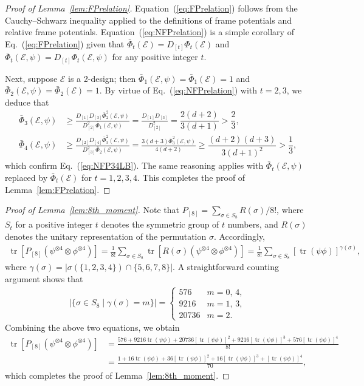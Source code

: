 \documentclass[aps,pra,twocolumn,nofootinbib,superscriptaddress,10pt]{revtex4-2}
\DeclareMathOperator{\tr}{tr}
\newcommand{\caE}{\mathcal{E}}
\newcommand{\bPhi}{\bar{\Phi}}
\newcommand{\eref}[1]{Eq.~\textup{(\ref{#1})}}
\newcommand{\Eref}[1]{Equation~\textup{(\ref{#1})}}
\newcommand{\lref}[1]{Lemma~\ref{#1}}
\begin{document}
\begin{proof}[Proof of \lref{lem:FPrelation}]
\Eref{eq:FPrelation} follows from the Cauchy--Schwarz inequality applied to the definitions of frame potentials and relative frame potentials. \Eref{eq:NFPrelation} is a simple corollary of \eref{eq:FPrelation} given that $\bPhi_t(\caE)=D_{[t]}\Phi_t(\caE)$ and $\bPhi_t(\caE,\psi)=D_{[t]}\Phi_t(\caE,\psi)$ for any positive integer $t$.

Next, suppose $\caE$ is a 2-design; then $\bPhi_1(\caE,\psi)=\bPhi_1(\caE)=1$ and $\bPhi_2(\caE,\psi)=\bPhi_2(\caE)=1$. By virtue of \eref{eq:NFPrelation} with $t=2,3$, we deduce that
\begin{align}
\bPhi_3(\caE,\psi)&\ge \frac{D_{[1]}D_{[3]}\bPhi_2^2(\caE,\psi)}{D_{[2]}^2 \bPhi_1(\caE,\psi)}=\frac{D_{[1]}D_{[3]}}{D_{[2]}^2}=\dfrac{2(d+2)}{3(d+1)}> \dfrac{2}{3},\\
\bPhi_4(\caE,\psi)&\ge \frac{D_{[2]}D_{[4]}\bPhi_3^2(\caE,\psi)}{D_{[3]}^2 \bPhi_2(\caE,\psi)} =\frac{3(d+3)\bPhi_3^2(\caE,\psi)}{4(d+2)} \ge\dfrac{(d+2)(d+3)}{3(d+1)^2}> \dfrac{1}{3},
\end{align}
which confirm \eref{eq:NFP34LB}. The same reasoning applies with $\bPhi_t(\caE,\psi)$ replaced by $\bPhi_t(\caE)$ for $t=1,2,3,4$. This completes the proof of \lref{lem:FPrelation}.
\end{proof}

\begin{proof}[Proof of \lref{lem:8th_moment}]
Note that $P_{[8]}=\sum_{\sigma \in S_8} R(\sigma)/8!$, where $S_t$ for a positive integer $t$ denotes the symmetric group of $t$ numbers, and $R(\sigma)$ denotes the unitary representation of the permutation $\sigma$. Accordingly,
\begin{align}
\tr\left[P_{[8]}\left(\psi^{\otimes 4}\otimes \phi^{\otimes 4}\right)\right] = \frac{1}{8!} \sum_{\sigma \in S_8} \tr\left[R(\sigma)\left(\psi^{\otimes 4}\otimes \phi^{\otimes 4} \right)\right]= \frac{1}{8!} \sum_{\sigma \in S_8} [\tr(\psi\phi)]^{\gamma(\sigma)},
\end{align}
where $\gamma(\sigma)=|\sigma(\{1,2,3,4\})\cap\{5,6,7,8\}|$. A straightforward counting argument shows that
\begin{align}
|\{\sigma \in S_8 \mid \gamma(\sigma)=m \}|=\begin{cases} 576 & m=0,\, 4,\\ 9216 & m=1,\, 3,\\ 20736 & m=2. \end{cases}
\end{align}
Combining the above two equations, we obtain
\begin{align}
\tr\left[P_{[8]}\left(\psi^{\otimes 4}\otimes \phi^{\otimes 4}\right)\right]&= \frac{576+9216\tr(\psi\phi)+20736\left[\tr(\psi\phi)\right]^2+9216\left[\tr(\psi\phi)\right]^3+576\left[\tr(\psi\phi)\right]^4}{8!}\nonumber\\
&=\frac{1+16\tr(\psi\phi)+36\left[\tr(\psi\phi)\right]^2+16\left[\tr(\psi\phi)\right]^3+\left[\tr(\psi\phi)\right]^4}{70}, \label{eq:8th_moment}
\end{align}
which completes the proof of \lref{lem:8th_moment}.
\end{proof}
\end{document}
